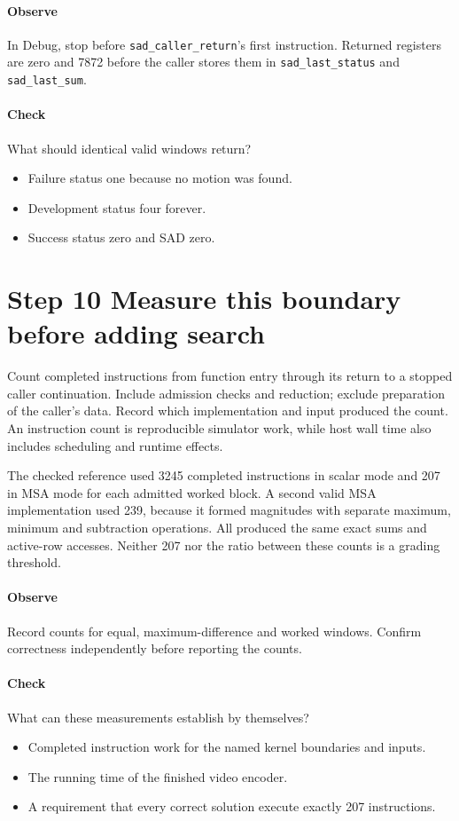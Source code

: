 \paragraph{Observe} In Debug, stop before \texttt{sad\_caller\_return}'s first
instruction. Returned registers are zero and 7872 before the caller stores them
in \texttt{sad\_last\_status} and \texttt{sad\_last\_sum}.
\paragraph{Check} What should identical valid windows return?
\begin{itemize}
  \item[A.] Failure status one because no motion was found.
  \item[B.] Development status four forever.
  \item[C.] Success status zero and SAD zero.
\end{itemize}

\section{Step 10 Measure this boundary before adding search}\label{h263-sad-s10}
Count completed instructions from function entry through its return to a stopped
caller continuation. Include admission checks and reduction; exclude preparation
of the caller's data. Record which implementation and input produced the count.
An instruction count is reproducible simulator work, while host wall time also
includes scheduling and runtime effects.

The checked reference used 3245 completed instructions in scalar mode and 207 in
MSA mode for each admitted worked block. A second valid MSA implementation used
239, because it formed magnitudes with separate maximum, minimum and subtraction
operations. All produced the same exact sums and active-row accesses. Neither
207 nor the ratio between these counts is a grading threshold.

\paragraph{Observe} Record counts for equal, maximum-difference and worked
windows. Confirm correctness independently before reporting the counts.
\paragraph{Check} What can these measurements establish by themselves?
\begin{itemize}
  \item[A.] Completed instruction work for the named kernel boundaries and inputs.
  \item[B.] The running time of the finished video encoder.
  \item[C.] A requirement that every correct solution execute exactly 207 instructions.
\end{itemize}
